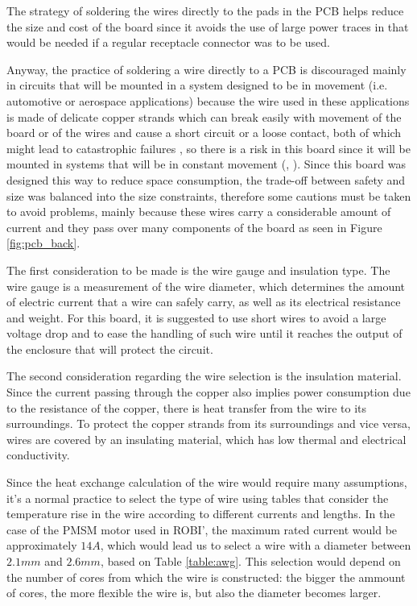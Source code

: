 The strategy of soldering the wires directly to the pads in the \ac{PCB} helps reduce the size and cost of the board since it avoids the use of large power traces in that would be needed if a regular receptacle connector was to be used.

Anyway, the practice of soldering a wire directly to a \ac{PCB} is discouraged mainly in circuits that will be mounted in a system designed to be in movement (i.e. automotive or aerospace applications) because the wire used in these applications is made of delicate copper strands which can break easily with movement of the board or of the wires and cause a short circuit or a loose contact, both of which might lead to catastrophic failures , so there is a risk in this board since it will be mounted in systems that will be in constant movement (\citeauthor{connectors}, \citeyear{connectors}). Since this board was designed this way to reduce space consumption, the trade-off between safety and size was balanced into the size constraints, therefore some cautions must be taken to avoid problems, mainly because these wires carry a considerable amount of current and they pass over many components of the board as seen in Figure \ref{fig:pcb_back}.

The first consideration to be made is the wire gauge and insulation type. The wire gauge is a measurement of the wire diameter, which determines the amount of electric current that a wire can safely carry, as well as its electrical resistance and weight. For this board, it is suggested to use short wires to avoid a large voltage drop and to ease the handling of such wire until it reaches the output of the enclosure that will protect the circuit.

The second consideration regarding the wire selection is the insulation material. Since the current passing through the copper also implies power consumption due to the resistance of the copper, there is heat transfer from the wire to its surroundings. To protect the copper strands from its surroundings and vice versa, wires are covered by an insulating material, which has low thermal and electrical conductivity.

Since the heat exchange calculation of the wire would require many assumptions, it’s a normal practice to select the type of wire using tables that consider the temperature rise in the wire according to different currents and lengths. In the case of the \ac{PMSM} motor used in ROBI', the maximum rated current would be approximately $14A$, which would lead us to select a wire with a diameter between $2.1mm$ and $2.6mm$, based on Table \ref{table:awg}. This selection would depend on the number of cores from which the wire is constructed: the bigger the ammount of cores, the more flexible the wire is, but also the diameter becomes larger.

